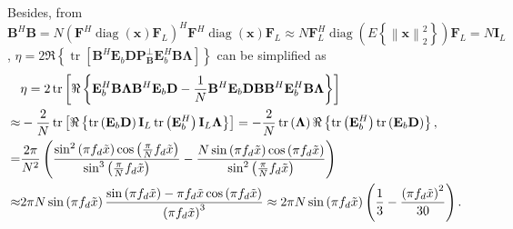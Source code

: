 \documentclass[12pt, draftclsnofoot, onecolumn]{IEEEtran}
\begin{document}
Besides, from ${{\mathbf{B}}^{H}}\mathbf{B} = N {{\left( {{\mathbf{F}}^{H}}\operatorname{diag}\left( \mathbf{x} \right){{\mathbf{F}}_{L}} \right)}^{H}}{{\mathbf{F}}^{H}}\operatorname{diag}\left( \mathbf{x} \right){{\mathbf{F}}_{L}}
 \approx N\mathbf{F}_{L}^{H}\operatorname{diag}\left( E\left\{ \left\| \mathbf{x} \right\|_{2}^{2} \right\} \right){{\mathbf{F}}_{L}} =N{{\mathbf{I}}_{L}}$, $\eta = 2\Re \left\{ \operatorname{tr}\left[ {{\mathbf{B}}^{H}}{{\mathbf{E}}_{b}} \mathbf{DP}_{\mathbf{B}}^{\bot } \mathbf{E}_{b}^{H}\mathbf{B}\mathbf{\Lambda} \right] \right\}$ can be simplified as
\begin{align} \label{eta}
 & \eta =2\operatorname{tr}\left[ \Re \left\{ \mathbf{E}_{b}^{H}\mathbf{B}\mathbf{\Lambda}{{\mathbf{B}}^{H}}{{\mathbf{E}}_{b}}\mathbf{D} - \frac{1}{N}{{\mathbf{B}}^{H}}{{\mathbf{E}}_{b}}\mathbf{DB}{{\mathbf{B}}^{H}}\mathbf{E}_{b}^{H}\mathbf{B}\mathbf{\Lambda}  \right\} \right] \nonumber \\
 \approx & -\frac{2}{N}\operatorname{tr}\left[ \Re \left\{ \operatorname{tr}\left( {{\mathbf{E}}_{b}}\mathbf{D} \right){{\mathbf{I}}_{L}} \operatorname{tr}\left( \mathbf{E}_{b}^{H} \right){{\mathbf{I}}_{L}} \mathbf{\Lambda} \right\} \right] = -\frac{2}{N} \operatorname{tr}\left( \mathbf{\Lambda} \right) \Re \left\{ \operatorname{tr}\left( \mathbf{E}_{b}^{H} \right)\operatorname{tr}\left( {{\mathbf{E}}_{b}}\mathbf{D} \right) \right\}, \nonumber \\
= & \frac{\text{2}{ \rm{\pi} }}{{{N}^{2}}} \left( \frac{{{\sin}^{\text{2}}}\left( { \rm{\pi} }{{f}_{d}}\tilde{x} \right)\cos \left( \frac{{ \rm{\pi} }}{N}{{f}_{d}}\tilde{x} \right)}{{{\sin }^{3}}\left( \frac{{ \rm{\pi} }}{N}{{f}_{d}}\tilde{x} \right)}-\frac{N\sin \left( { \rm{\pi} }{{f}_{d}}\tilde{x} \right)\cos \left( { \rm{\pi} }{{f}_{d}}\tilde{x} \right)}{{{\sin }^{2}}\left( \frac{{ \rm{\pi} }}{N}{{f}_{d}}\tilde{x} \right)} \right) \nonumber \\
\approx & 2{ \rm{\pi} }N\sin \left( { \rm{\pi} }{{f}_{d}}\tilde{x} \right) \frac{\sin \left( { \rm{\pi} }{{f}_{d}}\tilde{x} \right)-{ \rm{\pi} }{{f}_{d}}\tilde{x}\cos \left( { \rm{\pi} }{{f}_{d}}\tilde{x} \right)}{{{\left( { \rm{\pi} }{{f}_{d}}\tilde{x} \right)}^{3}}} \approx 2{ \rm{\pi} }N\sin \left( { \rm{\pi} }{{f}_{d}}\tilde{x} \right)\left( \frac{1}{3}-\frac{{{\left( { \rm{\pi} }{{f}_{d}}\tilde{x} \right)}^{2}}}{30} \right).
\end{align}
\end{document}
